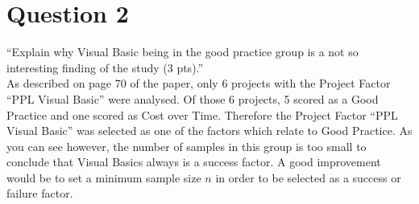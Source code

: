 \section{Question 2}

``Explain why Visual Basic being in the good practice group is a not so interesting finding of the study
(3 pts).'' \\

As described on page 70 of the paper, only 6 projects with the Project Factor ``PPL Visual Basic'' were analysed. Of those 6 projects, 5 scored as a Good Practice and one scored as Cost over Time. Therefore the Project Factor ``PPL Visual Basic'' was selected as one of the factors which relate to Good Practice. As you can see however, the number of samples in this group is too small to conclude that Visual Basics always is a success factor. A good improvement would be to set a minimum sample size $n$ in order to be selected as a success or failure factor.  